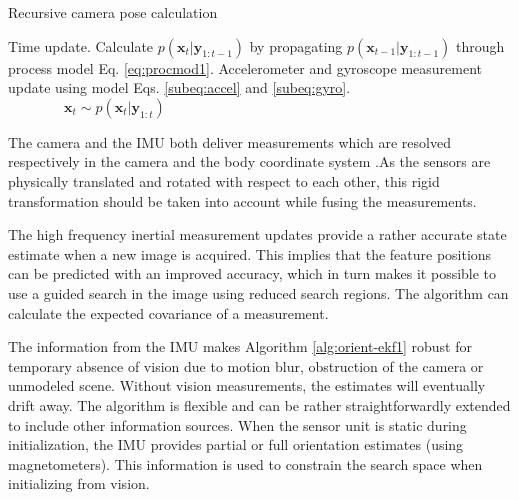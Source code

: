 \begin{algorithm}[H]
	\caption{Recursive camera pose calculation}\label{alg:orient-ekf1}
	\DontPrintSemicolon \SetAlgoLongEnd \SetAlgoLined 
	 
	 {    %
		Time update. Calculate $ p( \bm{x}_{t} | \bm{y}_{1:t-1} ) $ by propagating $ p( \bm{x}_{t-1} | \bm{y}_{1:t-1} ) $ through process model Eq. \ref{eq:procmod1}. \;
		Accelerometer and gyroscope measurement update using model Eqs. \ref{subeq:accel} and \ref{subeq:gyro}. \;
       	$ \qquad\qquad \bm{x}_{t} \sim p ( \bm{x}_{t} | \bm{y}_{1:t} ) $ \;
	} %
\end{algorithm}

The camera and the IMU both deliver measurements which are resolved respectively in the camera and the body coordinate system .As the sensors are physically translated and rotated with respect to each other, this rigid transformation should be taken into account while fusing the measurements.  

The high frequency inertial measurement updates provide a rather accurate state estimate when a new image is acquired. This implies that the feature positions can be predicted with an improved accuracy, which in turn makes it possible to use a guided search in the image using reduced search regions. The algorithm can calculate the expected covariance of a measurement. 

The information from the IMU makes Algorithm \ref{alg:orient-ekf1} robust for temporary absence of vision due to motion blur, obstruction of the camera or unmodeled scene. Without vision measurements, the estimates will eventually drift away. The algorithm is flexible and can be rather straightforwardly extended to include other information sources. When the sensor unit is static during initialization, the IMU provides partial or full orientation estimates (using magnetometers). This information is used to constrain the search space when initializing from vision.

